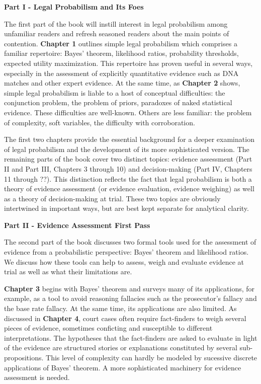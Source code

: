 \documentclass[10pt,dvipsnames,enabledeprecatedfontcommands]{scrartcl}
\begin{document}
\noindent \textbf{Part I - Legal Probabilism and Its Foes}

\noindent The first part of the book will instill interest in legal
probabilism among unfamiliar readers and refresh seasoned readers about
the main points of contention. \textbf{Chapter 1} outlines simple legal
probabilism which comprises a familiar repertoire: Bayes' theorem,
likelihood ratios, probability thresholds, expected utility
maximization. This repertoire has proven useful in several ways,
especially in the assessment of explicitly quantitative evidence such as
DNA matches and other expert evidence. At the same time, as
\textbf{Chapter 2} shows, simple legal probabilism is liable to a host
of conceptual difficulties: the conjunction problem, the problem of
priors, paradoxes of naked statistical evidence. These difficulties are
well-known. Others are less familiar: the problem of complexity, soft
variables, the difficulty with corroboration.

The first two chapters provide the essential background for a deeper
examination of legal probabilism and the development of its more
sophisticated version. The remaining parts of the book cover two
distinct topics: evidence assessment (Part II and Part III, Chapters 3
through 10) and decision-making (Part IV, Chapters 11 through ??). This
distinction reflects the fact that legal probabilism is both a theory of
evidence assessment (or evidence evaluation, evidence weighing) as well
as a theory of decision-making at trial. These two topics are obviously
intertwined in important ways, but are best kept separate for analytical
clarity.

\vspace{3mm}

\noindent \textbf{Part II - Evidence Assessment First Pass}

\noindent The second part of the book discusses two formal tools used
for the assessment of evidence from a probabilistic perspective: Bayes'
theorem and likelihood ratios. We discuss how these tools can help to
assess, weigh and evaluate evidence at trial as well as what their
limitations are.

\textbf{Chapter 3} begins with Bayes' theorem and surveys many of its
applications, for example, as a tool to avoid reasoning fallacies such
as the prosecutor's fallacy and the base rate fallacy. At the same time,
its applications are also limited. As discussed in \textbf{Chapter 4},
court cases often require fact-finders to weigh several pieces of
evidence, sometimes conficting and susceptible to different
interpretations. The hypotheses that the fact-finders are asked to
evaluate in light of the evidence are structured stories or explanations
constituted by several sub-propositions. This level of complexity can
hardly be modeled by sucessive discrete applications of Bayes' theorem.
A more sophisticated machinery for evidence assessment is needed.
\end{document}
